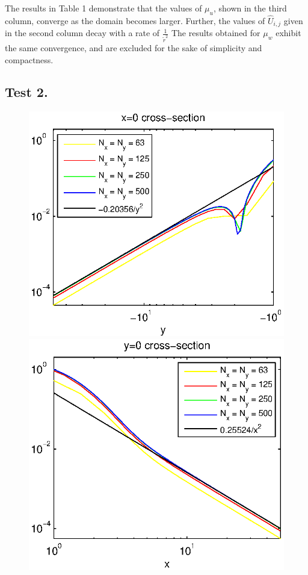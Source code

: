 \documentclass[12pt]{article}
\theoremstyle{theorem}
\theoremstyle{defi}
\begin{document}
The results in Table 1 demonstrate that the values of $\mu_u$, shown in the third column, converge as the domain becomes larger. Further, the values of $\widehat{U}_{i,j}$ given  in the second column decay with a rate of $\frac{1}{\tilde r^2}$
The results obtained for  $\mu_w$  exhibit the same convergence, and are excluded for the sake of simplicity and compactness.

\subsection{Test 2.}

\begin{figure}[ht]
	\begin{minipage}[b]{0.5\linewidth}
		\raggedleft
		\includegraphics[width=\linewidth]{crossSectionLogX=0.eps}
	\end{minipage}	
	\begin{minipage}[b]{0.5\linewidth}
		\raggedright
		 \includegraphics[width=\linewidth]{crossSectionLogY=0.eps}

\end{minipage}
\end{figure}
\end{document}
